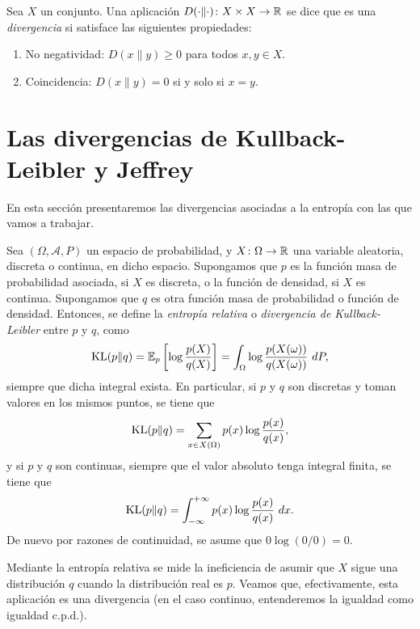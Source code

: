 \begin{definition}
    Sea $X$ un conjunto. Una aplicación $D(\cdot \| \cdot) \colon X \times X \to \mathbb{R}$ se dice que es una \emph{divergencia} si satisface las siguientes propiedades:

    \begin{enumerate}
        \item No negatividad: $D(x\|y) \ge 0$ para todos $x, y \in X$.
        \item Coincidencia: $D(x\|y) = 0$ si y solo si $x = y$.
    \end{enumerate}    
\end{definition}


\section{Las divergencias de Kullback-Leibler y Jeffrey}

En esta sección presentaremos las divergencias asociadas a la entropía con las que vamos a trabajar.

\begin{definition}
    Sea $(\Omega, \mathcal{A},P)$ un espacio de probabilidad, y $X \colon \Omega \to \mathbb{R}$ una variable aleatoria, discreta o continua, en dicho espacio. Supongamos que $p$ es la función masa de probabilidad asociada, si $X$ es discreta, o la función de densidad, si $X$ es continua. Supongamos que $q$ es otra función masa de probabilidad o función de densidad. Entonces, se define la \emph{entropía relativa} o \emph{divergencia de Kullback-Leibler} entre $p$ y $q$, como
    \[ \operatorname{KL}(p \| q) = \mathbb{E}_p\left[\log\frac{p(X)}{q(X)}\right] = \int_{\Omega} \log\frac{p(X(\omega))}{q(X(\omega))} \ dP, \]
    siempre que dicha integral exista. En particular, si $p$ y $q$ son discretas y toman valores en los mismos puntos, se tiene que
    \[ \operatorname{KL}(p \| q) = \sum_{x \in X(\Omega)} p(x) \log\frac{p(x)}{q(x)}, \]
    y si $p$ y $q$ son continuas, siempre que el valor absoluto tenga integral finita, se tiene que
    \[ \operatorname{KL}(p \| q) = \int_{-\infty}^{+\infty} p(x) \log\frac{p(x)}{q(x)} \ dx. \]
    De nuevo por razones de continuidad, se asume que $0 \log (0/0) = 0$.
\end{definition}

Mediante la entropía relativa se mide la ineficiencia de asumir que $X$ sigue una distribución $q$ cuando la distribución real es $p$. Veamos que, efectivamente, esta aplicación es una divergencia (en el caso continuo, entenderemos la igualdad como igualdad c.p.d.).

